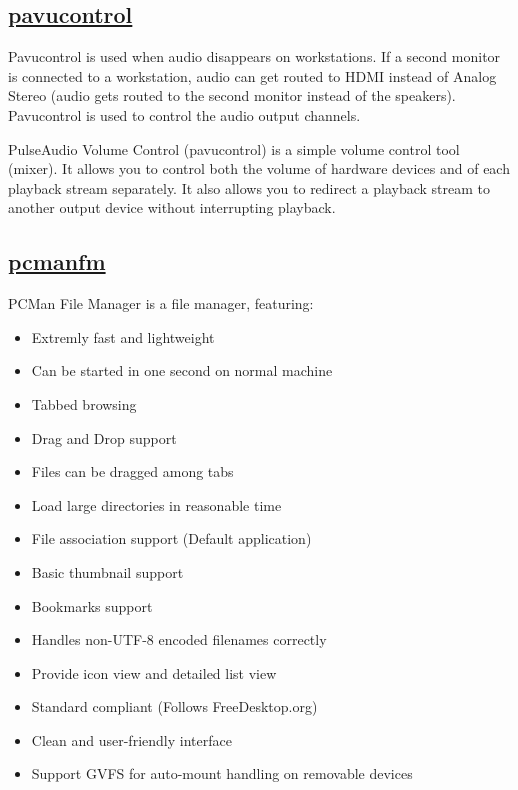 \subsection{\href{http://0pointer.de/lennart/projects/pavucontrol/}{pavucontrol}}

Pavucontrol is used when audio disappears on workstations.
If a second monitor is connected to a workstation, audio can get routed to
HDMI instead of Analog Stereo (audio gets routed to the second monitor instead
of the speakers). Pavucontrol is used to control the audio output channels.

 PulseAudio Volume Control (pavucontrol) is a simple volume
 control tool (mixer).
 It allows you to control both the volume of
 hardware devices and of each playback stream separately. It also allows
 you to redirect a playback stream to another output device without
 interrupting playback.

\subsection{\href{http://pcmanfm.sourceforge.net/}{pcmanfm}}

 PCMan File Manager is a file manager, featuring:
 
\begin{itemize}
 \item Extremly fast and lightweight
 \item Can be started in one second on normal machine
 \item Tabbed browsing
 \item Drag and Drop support
 \item Files can be dragged among tabs
 \item Load large directories in reasonable time
 \item File association support (Default application)
 \item Basic thumbnail support
 \item Bookmarks support
 \item Handles non-UTF-8 encoded filenames correctly
 \item Provide icon view and detailed list view
 \item Standard compliant (Follows FreeDesktop.org)
 \item Clean and user-friendly interface
 \item Support GVFS for auto-mount handling on removable devices
\end{itemize}

